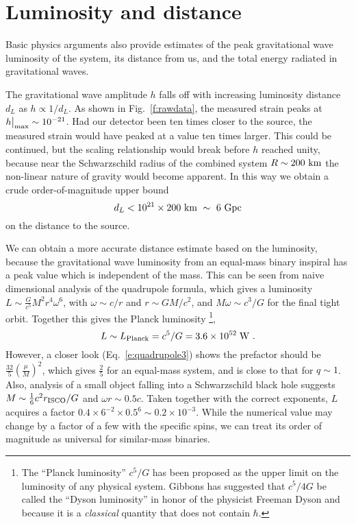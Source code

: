 \documentclass{andp2012}%
\def\w{\omega}
\def\({\left(}
\def\){\right)}
\def\be{\begin{equation}}
\def\ee{\end{equation}}
\newcommand{\refigure}[1]{Fig.~\ref{#1}}
\newcommand{\refeqn}[1]{Eq.\ \ref{#1}}
\def\Lplanck{L_{\rm Planck}}
\def\submax{\big|_{\rm max}}
\def\hmax{h\submax}
\def\BH{black hole }		\def\BHs{black holes }			\def\BHns{black hole}		\def\BHsns{black holes}		\def\GW{gravitational wave }		\def\GWs{gravitational waves }				\def\GWns{gravitational wave}		\def\GWsns{gravitational waves}		\def\LR{light ring }		\def\ISCO{innermost stable circular orbit }		\def\NS{neutron star }		\def\NSs{neutron stars }		\def\GR{general relativity }
\begin{document}
\section{Luminosity and distance}
\label{Sec:luminosity}

Basic physics arguments also provide estimates of the peak
\GW luminosity of the system,
its distance from us,
and the total energy
radiated in \GWsns.

The \GW amplitude $h$ falls off
with increasing luminosity distance $d_L$
as $h \propto 1/d_L$.
As shown in \refigure{f:rawdata},
the measured strain peaks at $\hmax\sim10^{-21}$.
Had our detector been
ten times closer to the source,
the measured strain would have peaked
at a value ten times larger.
This could be continued,
but the scaling relationship would break
before $h$ reached unity,
because near the Schwarzschild radius
of the combined system $R\sim200~{\rm km}$
the non-linear nature of gravity would become apparent.
In this way we obtain a crude order-of-magnitude upper bound
\be
d_L < 10^{21} \times 200~{\rm km}
~ \sim ~ 6~{\rm Gpc}
\ee
on the distance to the source.

We can obtain a more accurate distance estimate
based on the luminosity, because 
the \GW luminosity from an equal-mass
binary inspiral has a peak value
which is independent of the mass.
This can be seen from 
naive dimensional analysis of the quadrupole formula,
which  gives a luminosity
$L \sim \frac{G}{c^5} M^2 r^4 \w^6$,
with $\w\sim c/r$ and $r\sim G M / c^2$,
and $M \w\sim c^3 /G$ for the final tight orbit.
Together this gives the Planck luminosity
\footnote{The ``Planck luminosity'' $c^5/G$ has been proposed as the
  upper limit on the luminosity
  of any physical system\cite{Dyson,
    Massa, Hogan:1999hz}.  Gibbons \cite{Gibbons} has suggested that
  $c^5/4G$ be called the ``Dyson luminosity'' in honor of the
  physicist Freeman Dyson and because it is a {\it classical} quantity
  that does not contain $\hbar$.},
\be
L\sim \Lplanck = c^5 / G = 3.6 \times 10^{52} \; {\rm W}~.
\ee
However, a closer look (\refeqn{e:quadrupole3}) shows
the prefactor should be $\frac{32}{5}\(\frac{\mu}{M}\)^2$,
which gives $\frac{2}{5}$ for an equal-mass system,
and is close to that for $q\sim1$.
Also, analysis of a small object falling into a Schwarzschild \BH
suggests $M\sim \frac{1}{6} c^2 r_{\rm ISCO} / G$ and $\w r \sim 0.5 c$.
Taken together with the correct exponents,
$L$ acquires a factor $0.4 \times 6^{-2} \times 0.5^6 \sim 0.2 \times 10^{-3}$.
While the numerical value may change by a factor of a few
with the specific spins,
we can treat its order of magnitude as universal
for similar-mass binaries.
\end{document}
